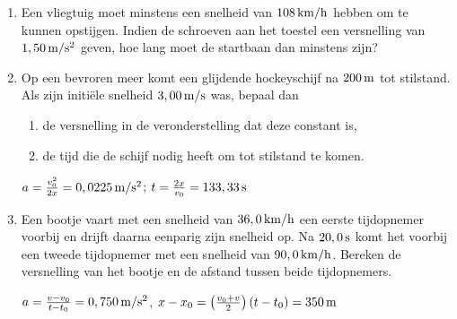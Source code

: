 \begin{enumerate}
\item Een vliegtuig moet minstens een snelheid van $108\rm\,km/h$ hebben om te kunnen opstijgen. Indien de schroeven aan het toestel een versnelling van $1,50\rm\,m/s^2$ geven, hoe lang moet de startbaan dan minstens zijn? 

\item Op een bevroren meer komt een glijdende hockeyschijf na $200\rm\,m$ tot stilstand. Als zijn initi\"ele snelheid $3,00\rm\,m/s$ was, bepaal dan
\begin{enumerate}
\item de versnelling in de veronderstelling dat deze constant is,
\item de tijd die de schijf nodig heeft om tot stilstand te komen.
\end{enumerate}
\begin{oplossing}
	$a=\frac{v_0^2}{2x}=0,0225\rm\,m/s^2$; $t=\frac{2x}{v_0}=133,33\rm\,s$
\end{oplossing}

\item Een bootje vaart met een snelheid van $36,0\rm\,km/h$ een eerste tijdopnemer voorbij en drijft daarna eenparig zijn snelheid op. Na $20,0\rm\,s$ komt het voorbij een tweede tijdopnemer met een snelheid van $90,0\rm\,km/h$. Bereken de versnelling van het bootje en de afstand tussen beide tijdopnemers.
\begin{oplossing}
\newline
$a=\frac{v-v_0}{t-t_0}=0,750\rm\,m/s^2$, $x-x_0=\left(\frac{v_0+v}{2}\right)(t-t_0)=350\rm\,m$
\end{oplossing}


\end{enumerate}
